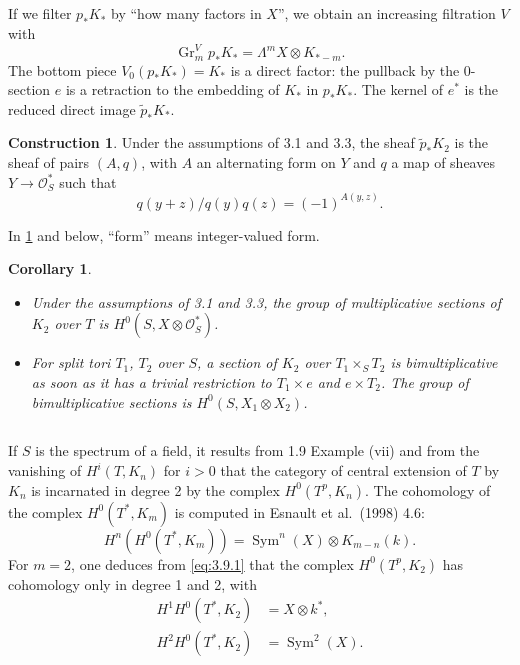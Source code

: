 \documentclass[11pt,a4paper]{article}
\theoremstyle{plain}
\newtheorem{corollary}[theorem]{Corollary}
\theoremstyle{definition}
\newtheorem{construction}[theorem]{Construction}
\DeclareMathOperator{\Gr}{Gr}
\DeclareMathOperator{\Sym}{Sym}
\newcommand{\cO}{\mathcal{O}}
\begin{document}
\subsection{}
If we filter $p_* K_*$ by ``how many factors in $X$'', we obtain an increasing filtration $V$ with
\begin{equation}\label{eq:3.4.1}
\Gr^V_m p_* K_* = \Lambda^m X \otimes K_{*-m}.
\end{equation}
The bottom piece $V_0(p_* K_*) = K_*$ is a direct factor: the pullback by the 0-section $e$ is a retraction to the embedding of $K_*$ in $p_* K_*$. The kernel of $e^*$ is the reduced direct image $\tilde{p}_* K_*$.

\begin{construction}\label{constr:3.5}
Under the assumptions of 3.1 and 3.3, the sheaf $\tilde{p}_* K_2$ is the sheaf of pairs $(A, q)$, with $A$ an alternating form on $Y$ and $q$ a map of sheaves $Y \to \cO^*_S$ such that
\begin{equation}\label{eq:3.5.1}
q(y+z)/q(y)q(z) = (-1)^{A(y,z)}.
\end{equation}
\end{construction}

In \ref{constr:3.5} and below, ``form'' means integer-valued form.

\begin{corollary}\label{cor:3.7}
\begin{itemize}
\item[(i)] Under the assumptions of 3.1 and 3.3, the group of multiplicative sections of $K_2$ over $T$ is $H^0(S, X \otimes \cO^*_S)$.
\item[(ii)] For split tori $T_1$, $T_2$ over $S$, a section of $K_2$ over $T_1 \times_S T_2$ is bimultiplicative as soon as it has a trivial restriction to $T_1 \times e$ and $e \times T_2$. The group of bimultiplicative sections is $H^0(S, X_1 \otimes X_2)$.
\end{itemize}
\end{corollary}

\subsection{}
If $S$ is the spectrum of a field, it results from 1.9 Example (vii) and from the vanishing of $H^i(T, K_n)$ for $i > 0$ that the category of central extension of $T$ by $K_n$ is incarnated in degree 2 by the complex $H^0(T^p, K_n)$. The cohomology of the complex $H^0(T^*, K_m)$ is computed in Esnault et al.~(1998) 4.6:
\begin{equation}\label{eq:3.9.1}
H^n(H^0(T^*, K_m)) = \Sym^n(X) \otimes K_{m-n}(k).
\end{equation}
For $m=2$, one deduces from \eqref{eq:3.9.1} that the complex $H^0(T^p, K_2)$ has cohomology only in degree 1 and 2, with
\begin{equation}\label{eq:3.9.2}
\begin{aligned}
H^1 H^0(T^*, K_2) &= X \otimes k^*, \\
H^2 H^0(T^*, K_2) &= \Sym^2(X).
\end{aligned}
\end{equation}
\end{document}
